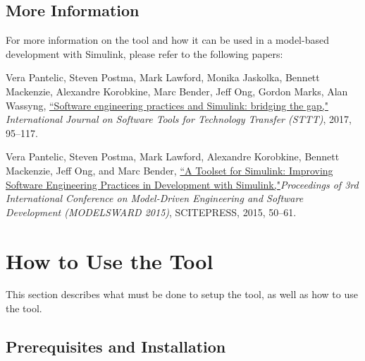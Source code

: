 \documentclass{article}
\begin{document}
\subsection{More Information}
For more information on the tool and how it can be used in a model-based development with Simulink, please refer to the following papers:

\vspace{1em}
Vera Pantelic, Steven Postma, Mark Lawford, Monika Jaskolka, Bennett Mackenzie, Alexandre Korobkine, Marc Bender, Jeff Ong, Gordon Marks, Alan Wassyng, \href{https://link.springer.com/article/10.1007/s10009-017-0450-9}{``Software engineering practices and Simulink: bridging the gap,"} \textit{International Journal on Software Tools for Technology Transfer (STTT)}, 2017, 95--117.

\vspace{1em}
Vera Pantelic, Steven Postma, Mark Lawford, Alexandre Korobkine, Bennett Mackenzie, Jeff Ong, and Marc Bender, \href{http://www.cas.mcmaster.ca/~lawford/papers/MODELSWARD2015.pdf}{``A Toolset for Simulink: Improving Software Engineering Practices in Development with Simulink,"}\textit{Proceedings of 3rd International Conference on Model-Driven Engineering and Software Development (MODELSWARD 2015)}, SCITEPRESS, 2015, 50--61.

\newpage	
\section{How to Use the Tool}
This section describes what must be done to setup the tool, as well as how to use the tool.

\subsection{Prerequisites and Installation}
\end{document}
